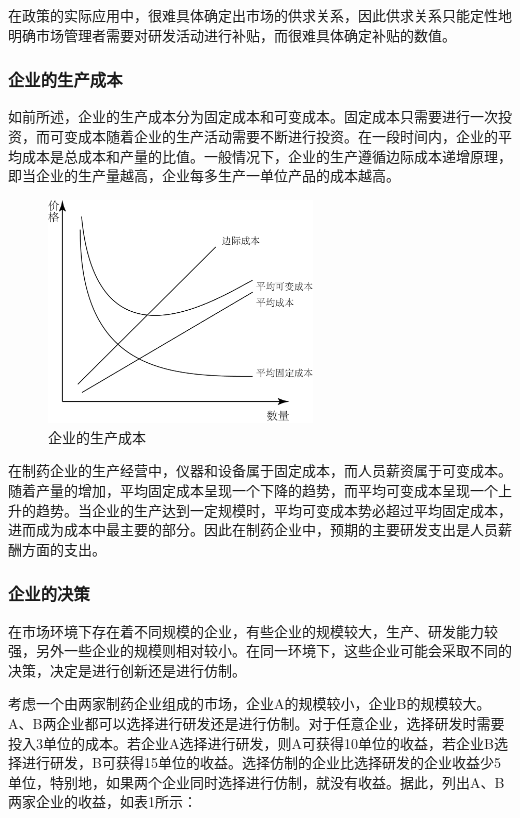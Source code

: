 \documentclass[twocolumn]{ctexbook}
\begin{document}
			在政策的实际应用中，很难具体确定出市场的供求关系，因此供求关系只能定性地明确市场管理者需要对研发活动进行补贴，而很难具体确定补贴的数值\citep{RN13}。
			
			\subsubsection{企业的生产成本}
			
			如前所述，企业的生产成本分为固定成本和可变成本。固定成本只需要进行一次投资，而可变成本随着企业的生产活动需要不断进行投资。在一段时间内，企业的平均成本是总成本和产量的比值。一般情况下，企业的生产遵循边际成本递增原理，即当企业的生产量越高，企业每多生产一单位产品的成本越高。
			
			\begin{figure}[ht]
				\centering
				\includegraphics[width=7cm]{fig7.png} %
				\caption{企业的生产成本}
				\label{fig:fig7}
			\end{figure}
			
			在制药企业的生产经营中，仪器和设备属于固定成本，而人员薪资属于可变成本。随着产量的增加，平均固定成本呈现一个下降的趋势，而平均可变成本呈现一个上升的趋势。当企业的生产达到一定规模时，平均可变成本势必超过平均固定成本，进而成为成本中最主要的部分。因此在制药企业中，预期的主要研发支出是人员薪酬方面的支出。
			
			\subsubsection{企业的决策}
			
			在市场环境下存在着不同规模的企业，有些企业的规模较大，生产、研发能力较强，另外一些企业的规模则相对较小。在同一环境下，这些企业可能会采取不同的决策，决定是进行创新还是进行仿制。
			
			考虑一个由两家制药企业组成的市场，企业A的规模较小，企业B的规模较大。A、B两企业都可以选择进行研发还是进行仿制。对于任意企业，选择研发时需要投入3单位的成本。若企业A选择进行研发，则A可获得10单位的收益，若企业B选择进行研发，B可获得15单位的收益。选择仿制的企业比选择研发的企业收益少5单位，特别地，如果两个企业同时选择进行仿制，就没有收益。据此，列出A、B两家企业的收益，如表1所示：
			
\end{document}
